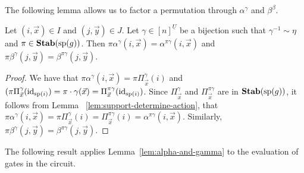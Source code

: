 \documentclass[../paper.tex]{subfiles}
\begin{document}
The following lemma allows us to factor a permutation through $\alpha^{\gamma}$
and $\beta^{\beta}$.

\begin{lem}
  \label{lem:alpha-and-gamma}
	Let $(i,\vec{x}) \in I$ and $(j, \vec{y}) \in J$. Let $\gamma \in
  [n]^{\underline{U}}$ be a bijection such that $\gamma^{-1} \sim \eta$ and $\pi
  \in \text{\textbf{Stab}} (\text{sp} (g))$. Then $\pi \alpha^{\gamma}(i, \vec{x}) = \alpha^{\pi
    \gamma}(i, \vec{x})$ and $\pi \beta^{\gamma}(j, \vec{y}) = \beta^{\pi
    \gamma}(j, \vec{y})$.
\end{lem}
\begin{proof}
	We have that $\pi \alpha^{\gamma}(i, \vec{x}) = \pi \Pi^{\gamma}_{\vec{x}}(i)$
  and $(\pi \Pi^{\gamma}_{\vec{x}}(\operatorname{id}_{\text{sp}(i)}) = \pi \cdot \gamma (\vec{x})
  = \Pi^{\pi \gamma}_{\vec{x}}(\operatorname{id}_{\text{sp}(i)})$. Since $\Pi^{\gamma}_{\vec{x}}$
  and $\Pi^{\pi \gamma}_{\vec{x}}$ are in $\text{\textbf{Stab}} (\text{sp} (g))$, it follows from Lemma
  ~\ref{lem:support-determine-action}, that $\pi \alpha^{\gamma}(i, \vec{x}) =
  \pi \Pi^{\gamma}_{\vec{x}} (i) = \Pi^{\pi \gamma}_{\vec{x}}(i) = \alpha^{\pi
    \gamma}(i, \vec{x})$. Similarly, $\pi \beta^{\gamma}(j, \vec{y}) =
  \beta^{\pi \gamma} (j, \vec{y})$.
\end{proof}

The following result applies Lemma~\ref{lem:alpha-and-gamma} to the evaluation
of gates in the circuit.
\end{document}
